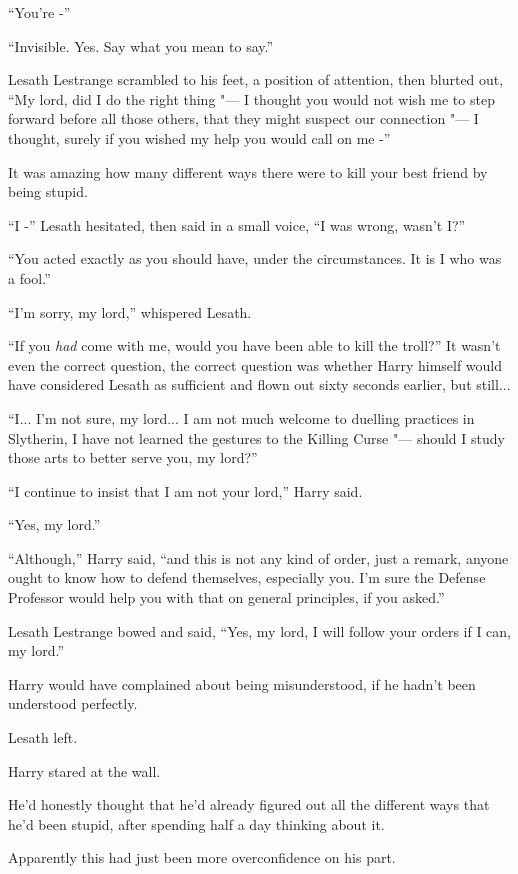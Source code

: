 ``You're -''

``Invisible. Yes. Say what you mean to say.''

Lesath Lestrange scrambled to his feet, a position of attention, then
blurted out, ``My lord, did I do the right thing "--- I thought you would
not wish me to step forward before all those others, that they might
suspect our connection "--- I thought, surely if you wished my help you
would call on me -''

It was amazing how many different ways there were to kill your best
friend by being stupid.

``I -'' Lesath hesitated, then said in a small voice, ``I was wrong,
wasn't I?''

``You acted exactly as you should have, under the circumstances. It is I
who was a fool.''

``I'm sorry, my lord,'' whispered Lesath.

``If you \emph{had} come with me, would you have been able to kill the
troll?'' It wasn't even the correct question, the correct question was
whether Harry himself would have considered Lesath as sufficient and
flown out sixty seconds earlier, but still...

``I... I'm not sure, my lord... I am not much welcome to
duelling practices in Slytherin, I have not learned the gestures to the
Killing Curse "--- should I study those arts to better serve you, my
lord?''

``I continue to insist that I am not your lord,'' Harry said.

``Yes, my lord.''

``Although,'' Harry said, ``and this is not any kind of order, just a
remark, anyone ought to know how to defend themselves, especially you.
I'm sure the Defense Professor would help you with that on general
principles, if you asked.''

Lesath Lestrange bowed and said, ``Yes, my lord, I will follow your
orders if I can, my lord.''

Harry would have complained about being misunderstood, if he hadn't been
understood perfectly.

Lesath left.

Harry stared at the wall.

He'd honestly thought that he'd already figured out all the different
ways that he'd been stupid, after spending half a day thinking about it.

Apparently this had just been more overconfidence on his part.

